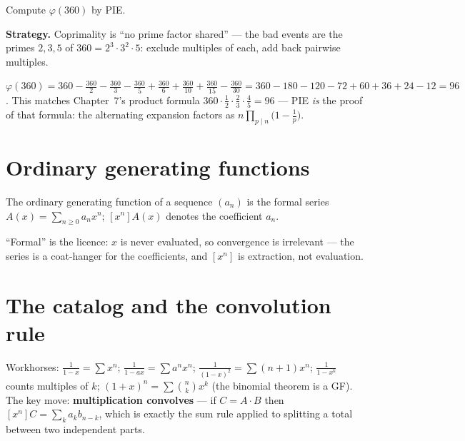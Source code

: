 \begin{example}\label{ex:phipie}
Compute $\varphi(360)$ by PIE.
\par\smallskip
\textbf{Strategy.} Coprimality is ``no prime factor shared'' --- the bad
events are the primes $2, 3, 5$ of $360 = 2^3 \cdot 3^2 \cdot 5$:
exclude multiples of each, add back pairwise multiples.
\par\smallskip
\begin{solution}
$\varphi(360) = 360 - \frac{360}{2} - \frac{360}{3} - \frac{360}{5}
+ \frac{360}{6} + \frac{360}{10} + \frac{360}{15} - \frac{360}{30}
= 360 - 180 - 120 - 72 + 60 + 36 + 24 - 12 = 96$.
This matches Chapter~7's product formula $360 \cdot \frac{1}{2} \cdot
\frac{2}{3} \cdot \frac{4}{5} = 96$ --- PIE \emph{is} the proof of that
formula: the alternating expansion factors as
$n \prod_{p \mid n}\bigl(1 - \frac{1}{p}\bigr)$.
\end{solution}
\end{example}

\section{Ordinary generating functions}\label{sec:ogf}

\begin{definition}
The ordinary generating function of a sequence $(a_n)$ is the formal
series $A(x) = \sum_{n \ge 0} a_n x^n$; $[x^n]A(x)$ denotes the
coefficient $a_n$.
\end{definition}

``Formal'' is the licence: $x$ is never evaluated, so convergence is
irrelevant --- the series is a coat-hanger for the coefficients, and
$[x^n]$ is extraction, not evaluation.

\section{The catalog and the convolution rule}\label{sec:catalog}
Workhorses: $\frac{1}{1-x} = \sum x^n$; $\frac{1}{1-ax} = \sum a^n x^n$;
$\frac{1}{(1-x)^2} = \sum (n+1)x^n$; $\frac{1}{1-x^k}$ counts multiples
of $k$; $(1+x)^n = \sum \binom{n}{k}x^k$ (the binomial theorem is a GF).
The key move: \textbf{multiplication convolves} --- if $C = A \cdot B$
then $[x^n]C = \sum_k a_k b_{n-k}$, which is exactly the sum rule
applied to splitting a total between two independent parts.

